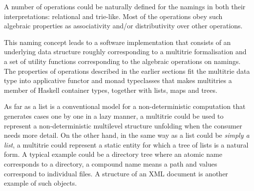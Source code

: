 \documentclass{article}
\theoremstyle{definition}
\begin{document}
A number of operations could be naturally defined for the namings in both
their interpretations: relational and trie-like. Most of the operations obey
such algebraic properties as associativity and/or distributivity over other
operations.

This naming concept leads to a software implementation that consists of an
underlying data structure roughly corresponding to a multitrie formalisation
and a set of utility functions corresponding to the algebraic operations on
namings. The properties of operations described in the earlier sections fit
the multitrie data type into applicative functor and monad
typeclasses that makes multitries a member of Haskell container types,
together with lists, maps and trees.

As far as a list is a conventional model for a non-deterministic computation
that generates cases one by one in a lazy manner, a multitrie could be used to
represent a non-deterministic multilevel structure unfolding when the consumer
needs more detail.  On the other hand, in the same way as a list could be
\emph{simply a list}, a multitrie could represent a static entity for which a
tree of lists is a natural form. A typical example could be a directory tree
where an atomic name corresponds to a directory, a compound name means a path
and values correspond to individual files.  A structure of an XML document is
another example of such objects.
\end{document}
